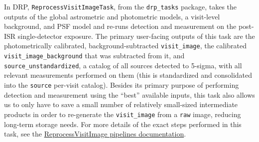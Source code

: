In DRP, \texttt{ReprocessVisitImageTask}, from the \texttt{drp\_tasks} package, takes the outputs of the global astrometric and photometric models, a visit-level background, and PSF model and re-runs detection and measurement on the post-ISR single-detector exposure.
The primary user-facing outputs of this task are the photometrically calibrated, background-subtracted \texttt{visit\_image}, the calibrated \texttt{visit\_image\_background} that was subtracted from it, and \texttt{source\_unstandardized}, a catalog of all sources detected to 5-sigma, with all relevant measurements performed on them (this is standardized and consolidated into the \texttt{source} per-visit catalog).
Besides its primary purpose of performing detection and measurement using the ``best'' available inputs, this task also allows us to only have to save a small number of relatively small-sized intermediate products in order to re-generate the \texttt{visit\_image} from a \texttt{raw} image, reducing long-term storage needs.
For more details of the exact steps performed in this task, see the \href{https://pipelines.lsst.io/v/daily/modules/lsst.drp.tasks/tasks/lsst.drp.tasks.reprocess_visit_image.ReprocessVisitImageTask.html}{ReprocessVisitImage pipelines documentation}.
